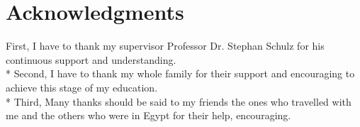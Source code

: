 \chapter*{Acknowledgments}
\label{chap:ack}
First, I have to thank my supervisor Professor Dr. Stephan Schulz for his continuous support and understanding.
\\*
Second, I have to thank my whole family for their support and encouraging to achieve this stage of my education.
\\*
Third, Many thanks should be said to my friends the ones who travelled with me and the others who were in Egypt for their help, encouraging. 
